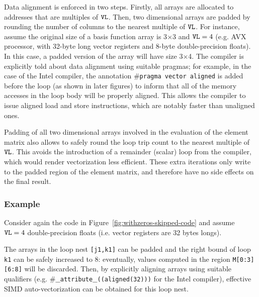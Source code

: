 Data alignment is enforced in two steps. Firstly, all arrays are allocated to addresses that are multiples of $\mbox{\texttt{VL}}$. Then, two dimensional arrays are padded by rounding the number of columns to the nearest multiple of $\mbox{\texttt{VL}}$. For instance, assume the original size of a basis function array is 3$\times$3 and $\mbox{\texttt{VL}}=4$ (e.g. AVX processor, with 32-byte long vector registers and 8-byte double-precision floats). In this case, a padded version of the array will have size 3$\times$4. The compiler is explicitly told about data alignment using suitable pragmas; for example, in the case of the Intel compiler, the annotation \texttt{$\#$pragma vector aligned} is added before the loop (as shown in later figures) to inform that all of the memory accesses in the loop body will be properly aligned. This allows the compiler to issue aligned load and store instructions, which are notably faster than unaligned ones.

Padding of all two dimensional arrays involved in the evaluation of the element matrix also allows to safely round the loop trip count to the nearest multiple of $\mbox{\texttt{VL}}$. This avoids the introduction of a remainder (scalar) loop from the compiler, which would render vectorization less efficient. These extra iterations only write to the padded region of the element matrix, and therefore have no side effects on the final result.

\subsubsection{Example}
Consider again the code in Figure~\ref{fig:withzeros-skipped-code} and assume $\mbox{\texttt{VL}}=4$ double-precision floats (i.e. vector registers are 32 bytes longs). 

The arrays in the loop nest \texttt{[j1,k1]} can be padded and the right bound of loop \texttt{k1} can be safely increased to 8: eventually, values computed in the region \texttt{M[0:3][6:8]} will be discarded. Then, by explicitly aligning arrays using suitable qualifiers (e.g. \texttt{$\#\_\_$attribute$\_\_$((aligned(32)))} for the Intel compiler), effective SIMD auto-vectorization can be obtained for this loop nest. 

